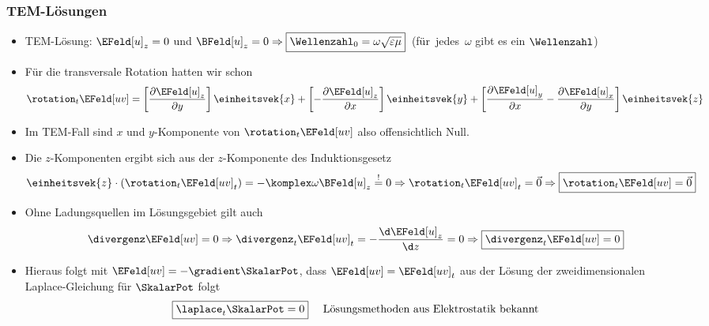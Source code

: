 \begin{frame}
\frametitle{TEM-Lösungen}
     \begin{itemize}[<+->]
     \item TEM-Lösung: \(\EFeld[u]_z = 0\) und \(\BFeld[u]_z=0 \Rightarrow \boxed{\Wellenzahl_0 = \omega \sqrt{\varepsilon\mu}}\)~(für~\alert{jedes}~\(\omega\) gibt es ein \(\Wellenzahl\)) 
    \item Für die transversale Rotation hatten wir schon
      \begin{equation*}
      \rotation_t \EFeld[uv] =  \left[ \frac{\partial \EFeld[u]_z}{\partial y} \right] \einheitsvek{x} + \left[ - \frac{\partial \EFeld[u]_{z}}{\partial x} \right] \einheitsvek{y } + \left[ \frac{\partial \EFeld[u]_{y}}{\partial x} - \frac{\partial \EFeld[u]_{x}}{\partial y}\right] \einheitsvek{z}
    \end{equation*}
  \item Im TEM-Fall sind \alert{\(x\) und \(y\)-Komponente} von \(\rotation_t \EFeld[uv]\) also \alert{offensichtlich Null}.
  \item Die \alert{\(z\)-Komponenten} ergibt sich aus der \(z\)-Komponente des Induktionsgesetz
     \begin{equation*}
        \einheitsvek{z} \cdot \left(\rotation_t \EFeld[uv]_t\right) = -\komplex\omega\BFeld[u]_z  \stackrel{!}{=} 0 \Rightarrow
        \rotation_t \EFeld[uv]_t = \vec{0} \Rightarrow \boxed{\rotation_t \EFeld[uv] = \vec{0}} 
      \end{equation*}
    \item Ohne Ladungsquellen im Lösungsgebiet gilt auch
      \begin{equation*}
     \divergenz\EFeld[uv] = 0 \Rightarrow \divergenz_t\EFeld[uv]_t = -\frac{\d \EFeld[u]_z}{\d z} = 0 \Rightarrow  \boxed{\divergenz_t\EFeld[uv]=0}
     \end{equation*}
    \item Hieraus folgt mit \(\EFeld[uv] = -\gradient\SkalarPot\), dass \(\EFeld[uv] = \EFeld[uv]_t\) aus der \alert{Lösung der zweidimensionalen Laplace-Gleichung} für \(\SkalarPot\) folgt
      \begin{equation*}
        \boxed{\laplace_t \SkalarPot = 0} \quad \text{ Lösungsmethoden aus Elektrostatik bekannt}
       \end{equation*}
     \end{itemize}
\end{frame}

